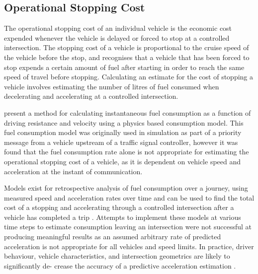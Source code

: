\subsection{Operational Stopping Cost}

The operational stopping cost of an individual vehicle is the economic cost expended whenever the vehicle is delayed or forced to stop at a controlled intersection. The stopping cost of a vehicle is proportional to the cruise speed of the vehicle before the stop, and recognises that a vehicle that has been forced to stop expends a certain amount of fuel after starting in order to reach the same speed of travel before stopping. Calculating an estimate for the cost of stopping a vehicle involves estimating the number of litres of fuel consumed when decelerating and accelerating at a controlled intersection.

\cite{kesting2013traffic} present a method for calculating instantaneous fuel consumption as a function of driving resistance and velocity using a physics based consumption model. This fuel consumption model was originally used in simulation as part of a priority message from a vehicle upstream of a traffic signal controller, however it was found that the fuel consumption rate alone is not appropriate for estimating the operational stopping cost of a vehicle, as it is dependent on vehicle speed and acceleration at the instant of communication.

Models exist for retrospective analysis of fuel consumption over a journey, using measured speed and acceleration rates over time and can be used to find the total cost of a stopping and accelerating through a controlled intersection after a vehicle has completed a trip \cite{kesting2013traffic,akcelik2003fuel,trieber2008congestion}. Attempts to implement these models at various time steps to estimate consumption leaving an intersection were not successful at producing meaningful results as an assumed arbitrary rate of predicted acceleration is not appropriate for all vehicles and speed limits. In practice, driver behaviour, vehicle characteristics, and intersection geometrics are likely to significantly de- crease the accuracy of a predictive acceleration estimation \cite{kesting2013traffic}.

